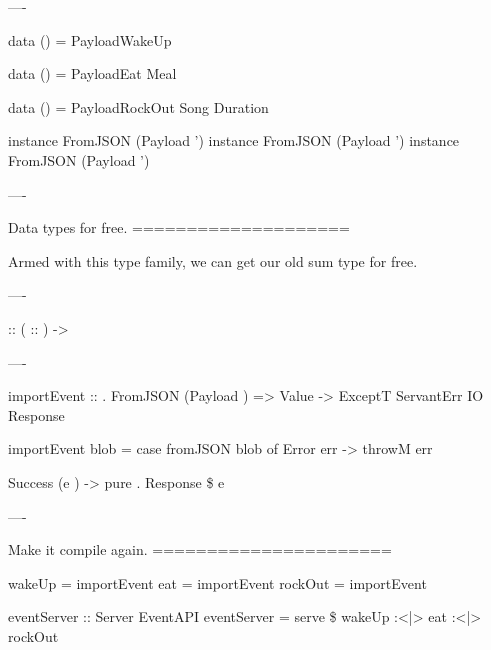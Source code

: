 ----

\begin{raw}
  data  () =
    PayloadWakeUp

  data  () =
    PayloadEat Meal

  data  () =
    PayloadRockOut Song Duration

  instance FromJSON (Payload ')
  instance FromJSON (Payload ')
  instance FromJSON (Payload ')
\end{raw}

----

Data types for free.
====================

Armed with this type family, we can get our old sum type for free.

----

\begin{custom}

    
     ::  ( :: ) -> 
\end{custom}

----

\begin{raw}

  importEvent :: 
               . FromJSON (Payload )
              => Value
              -> ExceptT ServantErr IO Response

  importEvent blob =
    case fromJSON blob of
      Error err ->
        throwM err

      Success (e ) ->
        pure . Response \$  e
\end{raw}

----

Make it compile again.
======================

\begin{raw}

  wakeUp  = importEvent 
  eat     = importEvent 
  rockOut = importEvent 

  eventServer :: Server EventAPI
  eventServer = serve \$
    wakeUp :<|> eat :<|> rockOut
\end{raw}

